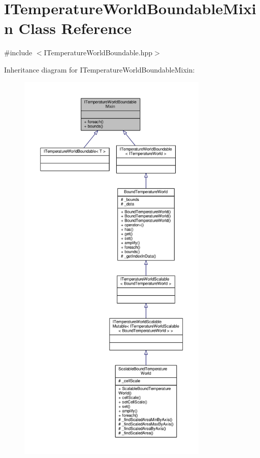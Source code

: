 \hypertarget{class_i_temperature_world_boundable_mixin}{\section{I\-Temperature\-World\-Boundable\-Mixin Class Reference}
\label{class_i_temperature_world_boundable_mixin}
}


{\ttfamily \#include $<$I\-Temperature\-World\-Boundable.\-hpp$>$}



Inheritance diagram for I\-Temperature\-World\-Boundable\-Mixin\-:
\nopagebreak
\begin{figure}[H]
\begin{center}
\leavevmode
\includegraphics[height=550pt]{class_i_temperature_world_boundable_mixin__inherit__graph}
\end{center}
\end{figure}


